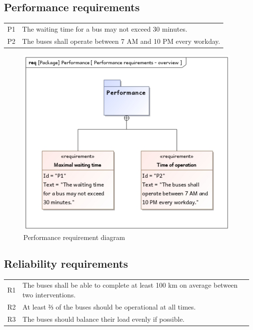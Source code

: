 \documentclass[a4paper]{article}
\begin{document}
\subsection{Performance requirements}
\begin{tabularx}{\textwidth}{p{.9cm} X}
        P1 & The waiting time for a bus may not exceed 30 minutes. \\
        P2 & The buses shall operate between 7 AM and 10 PM every workday. \\
\end{tabularx}

\begin{figure}
	\centering
	\includegraphics[width=.75\textwidth]{req-performance.jpg}
	\caption{Performance requirement diagram}%
	\label{fig:req-performance}
\end{figure}

\subsection{Reliability requirements}
\begin{tabularx}{\textwidth}{p{.9cm} X}
	R1 & The buses shall be able to complete at least 100 km on average
	     between two interventions. \\

	R2 & At least ⅔ of the buses should be operational at all times. \\

        R3 & The buses should balance their load evenly if possible. \\
\end{tabularx}
\end{document}
